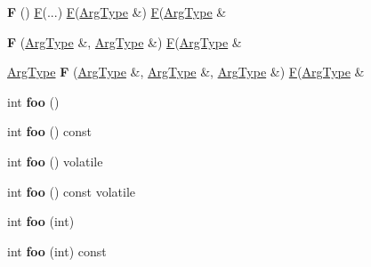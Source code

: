 \begin{DoxyCompactItemize}
\item 
\mbox{\label{struct_mem_fun03_a121e9310011b9cd07c21c823433bfef4}} 
{\bfseries F} () \mbox{\hyperlink{struct_f}{F}}(...) \mbox{\hyperlink{struct_f}{F}}(\mbox{\hyperlink{struct_arg_type}{Arg\+Type}} \&) \mbox{\hyperlink{struct_f}{F}}(\mbox{\hyperlink{struct_arg_type}{Arg\+Type}} \&
\item 
\mbox{\label{struct_mem_fun03_a37b030044bcdba8185dddef7a9e52ce3}} 
{\bfseries F} (\mbox{\hyperlink{struct_arg_type}{Arg\+Type}} \&, \mbox{\hyperlink{struct_arg_type}{Arg\+Type}} \&) \mbox{\hyperlink{struct_f}{F}}(\mbox{\hyperlink{struct_arg_type}{Arg\+Type}} \&
\item 
\mbox{\label{struct_mem_fun03_a2ba87717cb44073a36c8c253c35ad804}} 
\mbox{\hyperlink{struct_arg_type}{Arg\+Type}} {\bfseries F} (\mbox{\hyperlink{struct_arg_type}{Arg\+Type}} \&, \mbox{\hyperlink{struct_arg_type}{Arg\+Type}} \&, \mbox{\hyperlink{struct_arg_type}{Arg\+Type}} \&) \mbox{\hyperlink{struct_f}{F}}(\mbox{\hyperlink{struct_arg_type}{Arg\+Type}} \&
\item 
\mbox{\label{struct_mem_fun03_a916d2b3dadc38d85d6bee8d04cfe82d5}} 
int {\bfseries foo} ()
\item 
\mbox{\label{struct_mem_fun03_aa51d21faa70c4b76c56ce8e5b17519ad}} 
int {\bfseries foo} () const
\item 
\mbox{\label{struct_mem_fun03_a26039fa05d38d65b07871f67a008c7a0}} 
int {\bfseries foo} () volatile
\item 
\mbox{\label{struct_mem_fun03_a9425923dcd85b49dbb7701271b910a3a}} 
int {\bfseries foo} () const volatile
\item 
\mbox{\label{struct_mem_fun03_acb589be6e4c0f64966e9a02c8d738b29}} 
int {\bfseries foo} (int)
\item 
\mbox{\label{struct_mem_fun03_ae242a026960b1e9efa8c2e26f1ebab8e}} 
int {\bfseries foo} (int) const
\item 
\mbox{\label{struct_mem_fun03_aa33c7a4bcdb447ef3c94118761c1ff66}} 

\end{DoxyCompactItemize}
